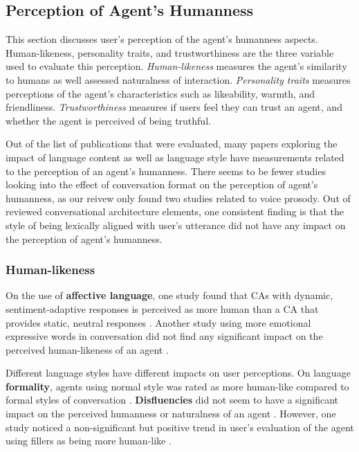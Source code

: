 \subsection{Perception of Agent's Humanness}

This section discusses user's perception of the agent's humanness aspects. Human-likeness, personality traits, and trustworthiness are the three variable used to evaluate this perception. \textit{Human-likeness} measures the agent's similarity to humans as well assessed naturalness of interaction. \textit{Personality traits} measures perceptions of the agent's characteristics such as likeability, warmth, and friendliness. \textit{Trustworthiness} measures if users feel they can trust an agent, and whether the agent is perceived of being truthful.

Out of the list of publications that were evaluated, many papers exploring the impact of language content as well as language style have measurements related to the perception of an agent's humanness. There seems to be fewer studies looking into the effect of conversation format on the perception of agent's humanness, as our reivew only found two studies related to voice prosody. Out of reviewed conversational architecture elements, one consistent finding is that the style of being lexically aligned with user's utterance did not have any impact on the perception of agent's humanness.

\subsubsection{Human-likeness}

On the use of \textbf{affective language}, one study found that CAs with dynamic, sentiment-adaptive responses is perceived as more human than a CA that provides static, neutral responses \cite{diederich2019emulating}\cmt{[25]}. Another study using more emotional expressive words in conversation did not find any significant impact on the perceived human-likeness of an agent \cite{zhu2022effects}\cmt{[26]}.

Different language styles have different impacts on user perceptions. On language \textbf{formality}, agents using normal style was rated as more human-like compared to formal styles of conversation \cite{ouchi2019should}\cmt{[59]}. \textbf{Disfluencies} did not seem to have a significant impact on the perceived humanness or naturalness of an agent \cite{jeong2019exploring}\cmt{[10]}\cite{pfeifer2009should}\cmt{[12]}. However, one study noticed a non-significant but positive trend in user's evaluation of the agent using fillers as being more human-like \cite{jeong2019exploring}\cmt{[10]}.

